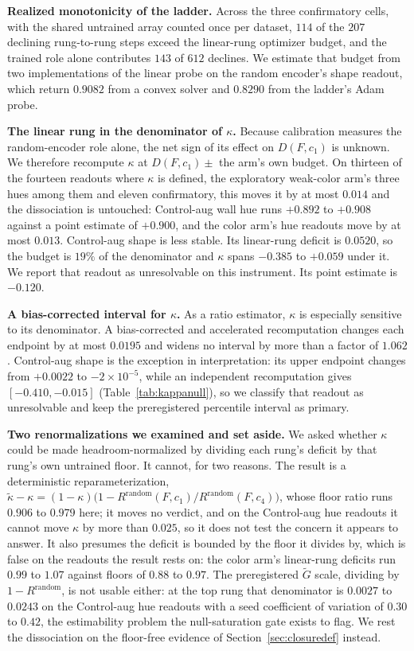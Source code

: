 \documentclass[10pt]{article}
\newcommand{\R}{R}
\newcommand{\G}{G}
\begin{document}
\textbf{Realized monotonicity of the ladder.} Across the three confirmatory cells, with the shared
untrained array counted once per dataset, $114$ of the $207$ declining rung-to-rung steps exceed the
linear-rung optimizer budget, and the trained role alone contributes $143$ of $612$ declines. We
estimate that budget from two implementations of the linear probe on
the random encoder's shape readout, which return $0.9082$ from a convex solver and $0.8290$ from the
ladder's Adam probe.

\textbf{The linear rung in the denominator of $\kappa$.} Because calibration measures the
random-encoder role alone, the net sign of its effect on $D(F,c_1)$ is unknown. We therefore
recompute $\kappa$ at $D(F, c_1) \pm$ the arm's own budget. On thirteen of the fourteen readouts
where $\kappa$ is defined, the exploratory weak-color arm's three hues among them and eleven
confirmatory, this moves it by at most $0.014$ and the dissociation is untouched: Control-aug wall
hue runs $+0.892$ to $+0.908$ against a point estimate of $+0.900$, and the color arm's hue
readouts move by at most $0.013$. Control-aug shape is less stable. Its linear-rung deficit is
$0.0520$, so the budget is $19\%$ of the denominator and $\kappa$ spans $-0.385$ to $+0.059$ under
it. We report that readout as unresolvable on this instrument. Its point estimate is $-0.120$.

\textbf{A bias-corrected interval for $\kappa$.} As a ratio estimator, $\kappa$ is especially
sensitive to its denominator. A
bias-corrected and accelerated recomputation changes each endpoint by at most $0.0195$ and widens no
interval by more than a factor of $1.062$. Control-aug shape is the exception in interpretation: its
upper endpoint changes from $+0.0022$ to $-2\times10^{-5}$, while an independent recomputation gives
$[-0.410,-0.015]$ (Table~\ref{tab:kappanull}), so we classify that readout as unresolvable and keep
the preregistered percentile interval as primary.

\textbf{Two renormalizations we examined and set aside.} We asked whether
$\kappa$ could be made headroom-normalized by dividing each rung's deficit by that rung's own
untrained floor. It cannot, for two reasons. The result is a deterministic reparameterization,
$\tilde{\kappa} - \kappa = (1 - \kappa)\bigl(1 - \R^{\mathrm{random}}(F, c_1) /
\R^{\mathrm{random}}(F, c_4)\bigr)$, whose floor ratio runs $0.906$ to $0.979$ here; it moves no
verdict, and on the Control-aug hue readouts it cannot move $\kappa$ by more than $0.025$, so
it does not test the concern it appears to answer.
It also presumes the deficit is bounded by the floor it divides by, which is false on the readouts
the result rests on: the color arm's linear-rung deficits run $0.99$ to $1.07$ against floors of
$0.88$ to $0.97$. The preregistered $\tilde{\G}$ scale, dividing by $1 -
\R^{\mathrm{random}}$, is not usable either: at the top rung that denominator is $0.0027$ to
$0.0243$ on the Control-aug hue readouts with a seed coefficient of variation of $0.30$ to $0.42$,
the estimability problem the null-saturation gate exists to flag. We rest the dissociation on the
floor-free evidence of Section~\ref{sec:closuredef} instead.
\end{document}
